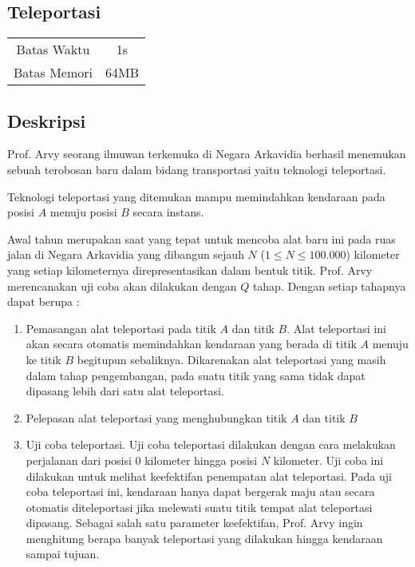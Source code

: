 \documentclass{article}
\begin{document}
\begin{center}
    \section*{Teleportasi} %

    \begin{tabular}{ | c c | }
        \hline
        Batas Waktu  & 1s \\    %
        Batas Memori & 64MB \\  %
        \hline
    \end{tabular}
\end{center}

\subsection*{Deskripsi}

Prof. Arvy seorang ilmuwan terkemuka di Negara Arkavidia berhasil menemukan sebuah terobosan baru dalam bidang transportasi yaitu teknologi teleportasi.

Teknologi teleportasi yang ditemukan mampu memindahkan kendaraan pada posisi $A$ menuju posisi $B$ secara instans.

Awal tahun merupakan saat yang tepat untuk mencoba alat baru ini pada ruas jalan di Negara Arkavidia yang dibangun sejauh $N$ ($1 \leq N \leq 100.000$) kilometer yang setiap kilometernya direpresentasikan dalam bentuk titik. Prof. Arvy merencanakan uji coba akan dilakukan dengan $Q$ tahap. Dengan setiap tahapnya dapat berupa :

\begin{enumerate}
    \setlength\itemsep{0pt}
    \item  Pemasangan alat teleportasi pada titik $A$ dan titik $B$. Alat teleportasi ini akan secara otomatis memindahkan kendaraan yang berada di titik $A$ menuju ke titik $B$ begitupun sebaliknya. Dikarenakan alat teleportasi yang masih dalam tahap pengembangan, pada suatu titik yang sama tidak dapat dipasang lebih dari satu alat teleportasi.

    \item Pelepasan alat teleportasi yang menghubungkan titik $A$ dan titik $B$

    \item Uji coba teleportasi. Uji coba teleportasi dilakukan dengan cara melakukan perjalanan dari posisi $0$ kilometer hingga posisi $N$ kilometer. Uji coba ini dilakukan untuk melihat keefektifan penempatan alat teleportasi. Pada uji coba teleportasi ini, kendaraan hanya dapat bergerak maju atau secara otomatis diteleportasi jika melewati suatu titik tempat alat teleportasi dipasang. Sebagai salah satu parameter keefektifan, Prof. Arvy ingin menghitung berapa banyak teleportasi yang dilakukan hingga kendaraan sampai tujuan.   
\end{enumerate}
\end{document}
